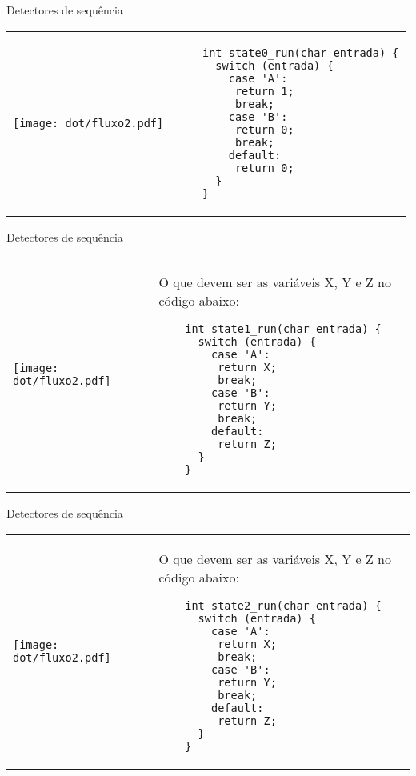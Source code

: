 \documentclass{beamer}
\begin{document}
\begin{frame}[fragile]{Detectores de sequência}
  \centering
  \large
  \begin{tabular}{l m{8cm}}
    \begin{minipage}{.3\textwidth}
   \texttt{[image: dot/fluxo2.pdf]}
    \end{minipage}
  &
    \begin{verbatim}
    int state0_run(char entrada) {
      switch (entrada) {
        case 'A':
         return 1;
         break;
        case 'B':
         return 0;
         break;
        default:
         return 0;
      }
    }
    \end{verbatim}
    \\
  \end{tabular}
\end{frame}

\begin{frame}[fragile]{Detectores de sequência}
  \centering
  \large
  \begin{tabular}{l m{8cm}}
    \begin{minipage}{.3\textwidth}
   \texttt{[image: dot/fluxo2.pdf]}
    \end{minipage}
  &
    O que devem ser as variáveis X, Y e Z no código abaixo:
    \begin{verbatim}
    int state1_run(char entrada) {
      switch (entrada) {
        case 'A':
         return X;
         break;
        case 'B':
         return Y;
         break;
        default:
         return Z;
      }
    }
    \end{verbatim}
    \\
  \end{tabular}
\end{frame}


\begin{frame}[fragile]{Detectores de sequência}
  \centering
  \large
  \begin{tabular}{l m{8cm}}
    \begin{minipage}{.3\textwidth}
   \texttt{[image: dot/fluxo2.pdf]}
    \end{minipage}
  &
    O que devem ser as variáveis X, Y e Z no código abaixo:
    \begin{verbatim}
    int state2_run(char entrada) {
      switch (entrada) {
        case 'A':
         return X;
         break;
        case 'B':
         return Y;
         break;
        default:
         return Z;
      }
    }
    \end{verbatim}
    \\
  \end{tabular}
\end{frame}
\end{document}
